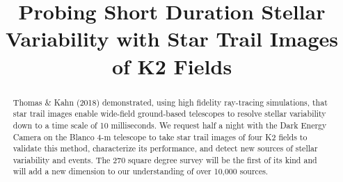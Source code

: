 \documentclass[11pt]{article}
\begin{document}
\title{Probing Short Duration Stellar Variability with Star Trail Images of K2 Fields}



%


\begin{abstract}
Thomas \& Kahn (2018) demonstrated, using high fidelity ray-tracing simulations, that star trail images enable wide-field ground-based telescopes to resolve stellar variability down to a time scale of 10 milliseconds. We request half a night with the Dark Energy Camera on the Blanco 4-m telescope to take star trail images of four K2 fields to validate this method, characterize its performance, and detect new sources of stellar variability and events. The 270 square degree survey will be the first of its kind and will add a new dimension to our understanding of over 10,000 sources.

\end{abstract}

\end{document}
